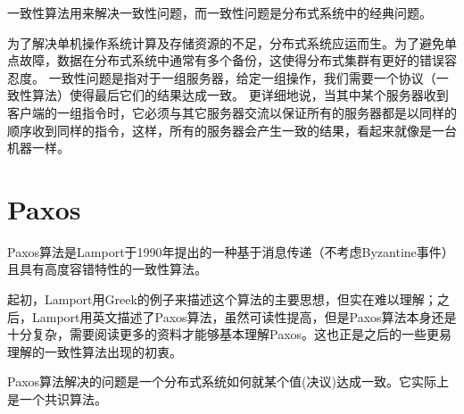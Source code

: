 \documentclass[UTF8]{article}
\begin{document}
%
%
%
%    
%    
%    
%    
%     

一致性算法用来解决一致性问题，而一致性问题是分布式系统中的经典问题。

为了解决单机操作系统计算及存储资源的不足，分布式系统应运而生。为了避免单点故障，数据在分布式系统中通常有多个备份，这使得分布式集群有更好的错误容忍度。
一致性问题是指对于一组服务器，给定一组操作，我们需要一个协议（一致性算法）使得最后它们的结果达成一致。
更详细地说，当其中某个服务器收到客户端的一组指令时，它必须与其它服务器交流以保证所有的服务器都是以同样的顺序收到同样的指令，这样，所有的服务器会产生一致的结果，看起来就像是一台机器一样。


\section{Paxos}

Paxos算法是Lamport于1990年提出的一种基于消息传递（不考虑Byzantine事件）且具有高度容错特性的一致性算法。

起初，Lamport用Greek的例子来描述这个算法的主要思想，但实在难以理解；之后，Lamport用英文描述了Paxos算法，虽然可读性提高，但是Paxos算法本身还是十分复杂，需要阅读更多的资料才能够基本理解Paxos。这也正是之后的一些更易理解的一致性算法出现的初衷。

Paxos算法解决的问题是一个分布式系统如何就某个值(决议)达成一致。它实际上是一个共识算法。
\end{document}
